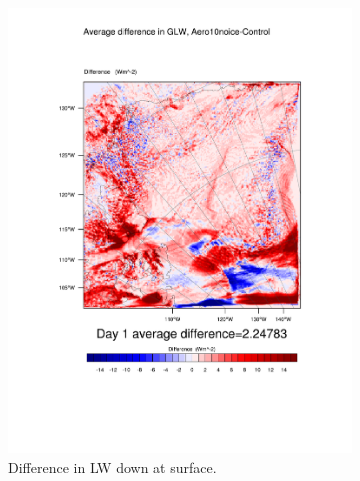 \begin{figure}
	\begin{subfigure}{0.48\textwidth}
		\centering
		\includegraphics[width=\textwidth]{results/aero10ni/diff_Aero10NoIce_GLW_Day1.pdf}
		\caption{Difference in LW down at surface.}
		\label{subfig:glw_r4Day1}
	\end{subfigure}
	\quad
	\begin{subfigure}{0.48\textwidth}
		\centering

\end{subfigure}
\end{figure}
